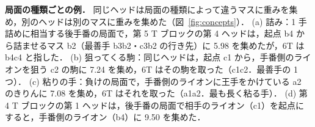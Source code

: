 \documentclass[submit]{ipsj}
\begin{document}
\textbf{局面の種類ごとの例．}
同じヘッドは局面の種類によって違うマスに重みを集め，別のヘッドは別のマスに重みを集めた（図~\ref{fig:concepts}）．
(a) 詰み：1 手詰めに相当する後手番の局面で，第 5 T ブロックの第 4 ヘッドは，起点 b4 から詰ませるマス b2（最善手 b3b2・c3b2 の行き先）に 5.98 を集めたが，6T は b4c4 と指した．
(b) 狙ってくる駒：同じヘッドは，起点 c1 から，手番側のライオンを狙う c2 の駒に 7.24 を集め，6T はその駒を取った（c1c2．最善手の 1 つ）．
(c) 粘りの手：負けの局面で，手番側のライオンに王手をかけている a2 のきりんに 7.08 を集め，6T はそれを取った（a1a2．最も長く粘る手）．
(d) 第 4 T ブロックの第 1 ヘッドは，後手番の局面で相手のライオン（c1）を起点にすると，手番側のライオン（b4）に 9.50 を集めた．
\end{document}
